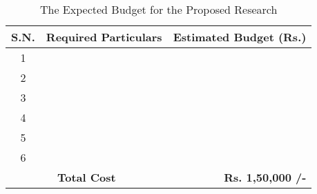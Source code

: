 \begin{table}[H]
\centering
\renewcommand{\arraystretch}{1.5}
\caption{The Expected Budget for the Proposed Research}
\begin{tabularx}{\textwidth}{|c|X|r|}
\hline
\textbf{S.N.} & \textbf{Required Particulars} & \textbf{Estimated Budget (Rs.)} \\
\hline
1 & & \\
\hline
2 & & \\
\hline
3 & & \\
\hline
4 & & \\
\hline
5 & & \\
\hline
6 & & \\
\hline
\multicolumn{2}{|c|}{\textbf{Total Cost}} & \textbf{Rs. 1,50,000 /-} \\
\hline

\end{tabularx}
\end{table}